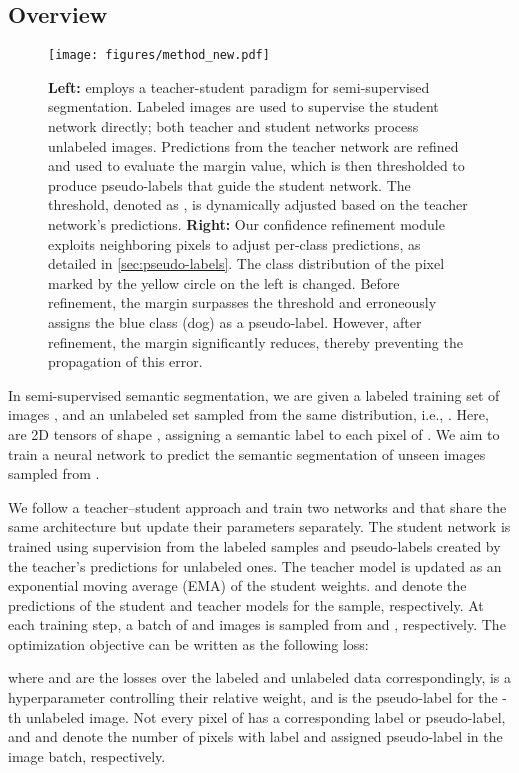 \documentclass{article}
\renewcommand{\cite}[1]{\citep{#1}}
\begin{document}
\subsection{Overview}
\begin{figure*}
	\centering
	\texttt{[image: figures/method\_new.pdf]} 
	\caption{\textbf{Left:} \methodname{} employs a teacher-student paradigm for semi-supervised segmentation. Labeled images are used to supervise the student network directly; both teacher and student networks process unlabeled images. Predictions from the teacher network are refined and used to evaluate the margin value, which is then thresholded to produce pseudo-labels that guide the student network. The threshold, denoted as , is dynamically adjusted based on the teacher network's predictions. \textbf{Right:} Our confidence refinement module exploits neighboring pixels to adjust per-class predictions, as detailed in \cref{sec:pseudo-labels}. The class distribution of the pixel marked by the yellow circle on the left is changed. Before refinement, the margin surpasses the threshold and erroneously assigns the blue class (dog) as a pseudo-label. However, after refinement, the margin significantly reduces, thereby preventing the propagation of this error.}
 \vspace{-0.5cm}
	\label{fig:method}
\end{figure*}
In semi-supervised semantic segmentation, we are given a labeled training set of images , and an unlabeled set  sampled from the same distribution, i.e., .  Here,  are 2D tensors of shape , assigning a semantic label to each pixel of . 
We aim to train a neural network  to predict the semantic segmentation of unseen images sampled from .

We follow a teacher--student approach 
\cite{tarvainen2017meanteacher} and train two networks  and  that share the same architecture but update their parameters separately. The student network  is trained using supervision from the labeled samples and pseudo-labels created by the teacher's predictions for unlabeled ones. The teacher model  is updated as an exponential moving average (EMA) of the student weights.
 and  denote the predictions of the student and teacher models for the  sample, respectively. At each training step, a batch of  and  images is sampled from  and , respectively.
The optimization objective can be written as the following loss:

where  and  are the losses over the labeled and unlabeled data correspondingly,   is a hyperparameter controlling their relative weight, and  is the pseudo-label for the -th unlabeled image. 
Not every pixel of  has a corresponding label or pseudo-label, and  and  denote the number of pixels with label and assigned pseudo-label in the image batch, respectively.
\end{document}
